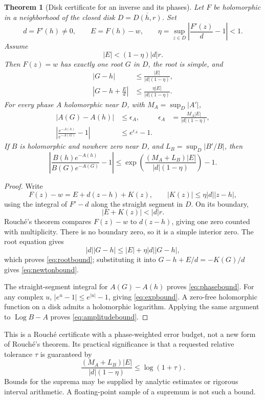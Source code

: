 \documentclass[11pt,a4paper]{article}
\newtheorem{theorem}{Theorem}[section]
\theoremstyle{definition}
\theoremstyle{remark}
\newcommand{\Log}{\operatorname{Log}}
\numberwithin{equation}{section}
\begin{document}
\begin{theorem}[Disk certificate for an inverse and its phases]\label{thm:disk}
Let $F$ be holomorphic in a neighborhood of the closed disk $D=\overline{D(h,r)}$. Set
\[
 d=F'(h)\ne0,\qquad E=F(h)-w,
\qquad \eta=\sup_{z\in D}\left|\frac{F'(z)}d-1\right|<1.
\]
Assume
\begin{equation}\label{eq:rouchecondition}
 |E|<(1-\eta)|d|r.
\end{equation}
Then $F(z)=w$ has exactly one root $G$ in $D$, the root is simple, and
\begin{align}
 |G-h|&\le \frac{|E|}{|d|(1-\eta)},\label{eq:rootbound}\\
 \left|G-h+\frac Ed\right|
 &\le\frac{\eta |E|}{|d|(1-\eta)}.\label{eq:newtonbound}
\end{align}
For every phase $A$ holomorphic near $D$, with $M_A=\sup_D|A'|$,
\begin{align}
 |A(G)-A(h)|&\le \epsilon_A,
 &\epsilon_A&=\frac{M_A|E|}{|d|(1-\eta)},\label{eq:phasebound}\\
 \left|\frac{e^{-A(h)}}{e^{-A(G)}}-1\right|
 &\le e^{\epsilon_A}-1.\label{eq:expbound}
\end{align}
If $B$ is holomorphic and nowhere zero near $D$, and $L_B=\sup_D|B'/B|$, then
\begin{equation}\label{eq:amplitudebound}
 \left|\frac{B(h)e^{-A(h)}}{B(G)e^{-A(G)}}-1\right|
 \le \exp\left(\frac{(M_A+L_B)|E|}{|d|(1-\eta)}\right)-1.
\end{equation}
\end{theorem}
\begin{proof}
Write
\[
 F(z)-w=E+d(z-h)+K(z),\qquad |K(z)|\le\eta|d||z-h|,
\]
using the integral of $F'-d$ along the straight segment in $D$. On its boundary,
\[
 |E+K(z)|<|d|r.
\]
Rouch\'e's theorem compares $F(z)-w$ to $d(z-h)$, giving one zero counted with multiplicity. There is no boundary zero, so it is a simple interior zero. The root equation gives
\[
 |d||G-h|\le |E|+\eta|d||G-h|,
\]
which proves \eqref{eq:rootbound}; substituting it into $G-h+E/d=-K(G)/d$ gives \eqref{eq:newtonbound}.

The straight-segment integral for $A(G)-A(h)$ proves \eqref{eq:phasebound}. For any complex $u$, $|e^u-1|\le e^{|u|}-1$, giving \eqref{eq:expbound}. A zero-free holomorphic function on a disk admits a holomorphic logarithm. Applying the same argument to $\Log B-A$ proves \eqref{eq:amplitudebound}.
\end{proof}

This is a Rouch\'e certificate with a phase-weighted error budget, not a new form of Rouch\'e's theorem. Its practical significance is that a requested relative tolerance $\tau$ is guaranteed by
\begin{equation}\label{eq:stoppingcertificate}
 \frac{(M_A+L_B)|E|}{|d|(1-\eta)}\le\log(1+\tau).
\end{equation}
Bounds for the suprema may be supplied by analytic estimates or rigorous interval arithmetic. A floating-point sample of a supremum is not such a bound.
\end{document}
